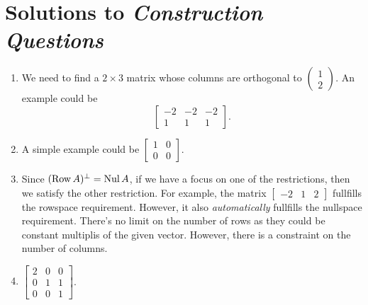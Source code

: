 \section{Solutions to \textit{Construction Questions}}
	\begin{enumerate}
		\item We need to find a \(2 \times 3\) matrix whose columns are orthogonal to \(\begin{pmatrix}1 \\ 2\end{pmatrix}\). An example could be 
			 \[\begin{bmatrix}-2 & -2 & -2\\ 1 & 1 & 1\end{bmatrix}.\]
		\item A simple example could be \(\begin{bmatrix}1 & 0 \\ 0 & 0\end{bmatrix}\).
		\item Since \((\operatorname{Row} A)^\perp = \operatorname{Nul} A\), if we have a focus on one of the restrictions, then we satisfy the other restriction. For example,
			the matrix \(\begin{bmatrix}-2 & 1 & 2\end{bmatrix}\) fullfills the rowspace requirement. However, it also \emph{automatically} fullfills the
			nullspace requirement. There's no limit on the number of rows as they could be constant multiplis of the given vector. However, there is a 
			constraint on the number of columns.
		\item \(\begin{bmatrix}2 & 0 & 0 \\ 0 & 1 & 1 \\ 0 & 0 & 1\end{bmatrix}\).
	\end{enumerate}

